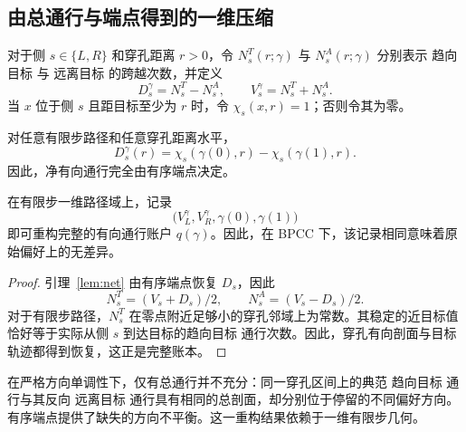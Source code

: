\subsection{由总通行与端点得到的一维压缩}\label{sec:compression}

对于侧 $s\in\{L,R\}$ 和穿孔距离 $r>0$，令 $N_s^T(r;\gamma)$ 与 $N_s^A(r;\gamma)$ 分别表示 趋向目标 与 远离目标 的跨越次数，并定义
\[
 D_s^\gamma=N_s^T-N_s^A,
 \qquad
 V_s^\gamma=N_s^T+N_s^A.
\]
当 $x$ 位于侧 $s$ 且距目标至少为 $r$ 时，令 $\chi_s(x,r)=1$；否则令其为零。

\begin{lemma}[净通行守恒]\label{lem:net}
对任意有限步路径和任意穿孔距离水平，
\[
 D_s^\gamma(r)
 =\chi_s(\gamma(0),r)-\chi_s(\gamma(1),r).
\]
因此，净有向通行完全由有序端点决定。
\end{lemma}

\begin{proposition}[由总通行与有序端点无损重构]\label{prop:gross-endpoints}
在有限步一维路径域上，记录
\[
 \bigl(V_L^\gamma,V_R^\gamma,\gamma(0),\gamma(1)\bigr)
\]
即可重构完整的有向通行账户 $q(\gamma)$。因此，在 BPCC 下，该记录相同意味着原始偏好上的无差异。
\end{proposition}

\begin{proof}
引理~\ref{lem:net} 由有序端点恢复 $D_s$，因此
\[
 N_s^T=(V_s+D_s)/2,
 \qquad
 N_s^A=(V_s-D_s)/2.
\]
对于有限步路径，$N_s^T$ 在零点附近足够小的穿孔邻域上为常数。其稳定的近目标值恰好等于实际从侧 $s$ 到达目标的趋向目标 通行次数。因此，穿孔有向剖面与目标轨迹都得到恢复，这正是完整账本。
\end{proof}

在严格方向单调性下，仅有总通行并不充分：同一穿孔区间上的典范 趋向目标 通行与其反向 远离目标 通行具有相同的总剖面，却分别位于停留的不同偏好方向。有序端点提供了缺失的方向不平衡。这一重构结果依赖于一维有限步几何。
